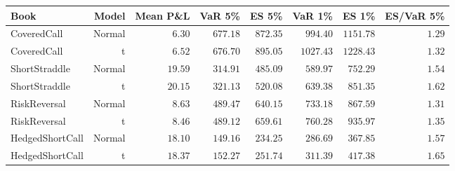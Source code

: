 \begin{tabular}{lrrrrrrr}
\toprule
Book & Model & Mean P\&L & VaR 5\% & ES 5\% & VaR 1\% & ES 1\% & ES/VaR 5\% \\
\midrule
CoveredCall & Normal & $6.30$ & $677.18$ & $872.35$ & $994.40$ & $1151.78$ & $1.29$ \\
CoveredCall & t & $6.52$ & $676.70$ & $895.05$ & $1027.43$ & $1228.43$ & $1.32$ \\
ShortStraddle & Normal & $19.59$ & $314.91$ & $485.09$ & $589.97$ & $752.29$ & $1.54$ \\
ShortStraddle & t & $20.15$ & $321.13$ & $520.08$ & $639.38$ & $851.35$ & $1.62$ \\
RiskReversal & Normal & $8.63$ & $489.47$ & $640.15$ & $733.18$ & $867.59$ & $1.31$ \\
RiskReversal & t & $8.46$ & $489.12$ & $659.61$ & $760.28$ & $935.97$ & $1.35$ \\
HedgedShortCall & Normal & $18.10$ & $149.16$ & $234.25$ & $286.69$ & $367.85$ & $1.57$ \\
HedgedShortCall & t & $18.37$ & $152.27$ & $251.74$ & $311.39$ & $417.38$ & $1.65$ \\
\bottomrule
\end{tabular}
